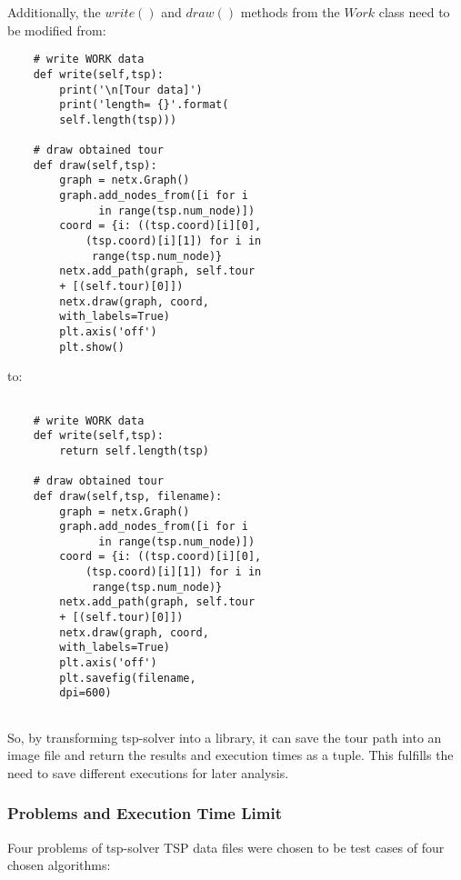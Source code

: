 \documentclass[conference]{IEEEtran}
\begin{document}
Additionally, the $write()$ and $draw()$ methods from the $Work$ class need to be modified from:

\begin{verbatim}
    # write WORK data 
    def write(self,tsp):
        print('\n[Tour data]')
        print('length= {}'.format(
        self.length(tsp)))

    # draw obtained tour
    def draw(self,tsp):
        graph = netx.Graph()
        graph.add_nodes_from([i for i 
              in range(tsp.num_node)])
        coord = {i: ((tsp.coord)[i][0], 
        	(tsp.coord)[i][1]) for i in 
        	 range(tsp.num_node)}
        netx.add_path(graph, self.tour 
        + [(self.tour)[0]])
        netx.draw(graph, coord, 
        with_labels=True)
        plt.axis('off')
        plt.show()
\end{verbatim}

to:

\begin{verbatim}
 
    # write WORK data 
    def write(self,tsp):
        return self.length(tsp)
 
    # draw obtained tour
    def draw(self,tsp, filename):
        graph = netx.Graph()
        graph.add_nodes_from([i for i 
              in range(tsp.num_node)])
        coord = {i: ((tsp.coord)[i][0], 
        	(tsp.coord)[i][1]) for i in
        	 range(tsp.num_node)}
        netx.add_path(graph, self.tour 
        + [(self.tour)[0]])
        netx.draw(graph, coord, 
        with_labels=True)
        plt.axis('off')
        plt.savefig(filename, 
        dpi=600)
 
\end{verbatim}

So, by transforming tsp-solver into a library, it can save the tour path into an image file and return the results and execution times as a tuple. This fulfills the need to save different executions for later analysis.

\subsubsection{Problems and Execution Time Limit}

Four problems of tsp-solver TSP data files were chosen to be test cases of  four chosen algorithms:
\end{document}
